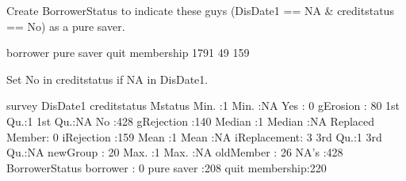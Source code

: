 Create \textsf{BorrowerStatus} to indicate these guys (\textsf{DisDate1} == NA \& \textsf{creditstatus} == No) as a \textsf{pure saver}. \gobblepars
\begin{Schunk}
\begin{Soutput}

       borrower      pure saver quit membership 
           1791              49             159 
\end{Soutput}
\end{Schunk}
Set \textsf{No} in \textsf{creditstatus} if NA in \textsf{DisDate1}.
\begin{Schunk}
\begin{Soutput}
     survey     DisDate1            creditstatus         Mstatus   
 Min.   :1   Min.   :NA    Yes            :  0   gErosion    : 80  
 1st Qu.:1   1st Qu.:NA    No             :428   gRejection  :140  
 Median :1   Median :NA    Replaced Member:  0   iRejection  :159  
 Mean   :1   Mean   :NA                          iReplacement:  3  
 3rd Qu.:1   3rd Qu.:NA                          newGroup    : 20  
 Max.   :1   Max.   :NA                          oldMember   : 26  
             NA's   :428                                           
         BorrowerStatus
 borrower       :  0   
 pure saver     :208   
 quit membership:220   
                       
                       
                       
                       
\end{Soutput}
\end{Schunk}

